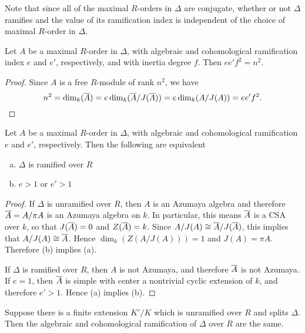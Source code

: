 Note that since all of the maximal $R$-orders in $\Delta$ are conjugate, whether or not $\Delta$ ramifies and the value of its ramification index is independent of the choice of maximal $R$-order in $\Delta$.
\begin{lem}
Let $A$ be a maximal $R$-order in $\Delta$, with algebraic and cohomological ramification index $e$ and $e'$, respectively, and with inertia degree $f$.  Then $ee'f^2 = n^2$.
\end{lem}
\begin{proof}
Since $A$ is a free $R$-module of rank $n^2$, we have
$$n^2 = \dim_{k}(\overline{A}) = e\dim_{k}(\overline{A}/J(\overline{A})) = e\dim_k(A/J(A)) = ee'f^2.$$
\end{proof}

\begin{prop}
Let $A$ be a maximal $R$-order in $\Delta$, with algebraic and cohomological ramification $e$ and $e'$, respectively.  Then the following are equivalent
\begin{enumerate}[(a)]
\item  $\Delta$ is ramified over $R$
\item  $e>1$ or $e'>1$
\end{enumerate}
\end{prop}
\begin{proof}
If $\Delta$ is unramified over $R$, then $A$ is an Azumaya algebra and therefore $\overline{A} = A/\pi A$ is an Azumaya algebra on $k$.  In particular, this means $\overline{A}$ is a CSA over $k$, so that $J(\overline{A}) = 0$ and $Z(\overline{A}) = k$.  Since $A/J(A)\cong \overline{A}/J(\overline{A})$, this implies that $A/J(A)\cong \overline{A}$.  Hence $\dim_k(Z(A/J(A))) = 1$ and $J(A) = \pi A$.  Therefore (b) implies (a).

If $\Delta$ is ramified over $R$, then $A$ is not Azumaya, and therefore $\overline{A}$ is not Azumaya.  If $e = 1$, then $\overline{A}$ is simple with center a nontrivial cyclic extension of $k$, and therefore $e'>1$.  Hence (a) implies (b).
\end{proof}

\begin{thm}
Suppose there is a finite extension $K'/K$ which is unramified over $R$ and splits $\Delta$.  Then the algebraic and cohomological ramification of $\Delta$ over $R$ are the same.
\end{thm}




